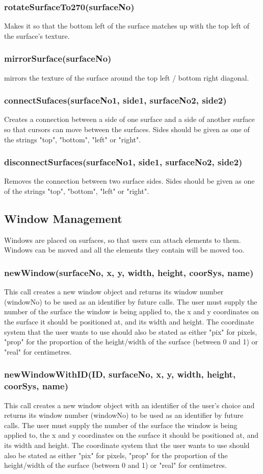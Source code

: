 \documentclass{acm_proc_article-sp}
\begin{document}
\subsubsection{rotateSurfaceTo270(surfaceNo)}
Makes it so that the bottom left of the surface matches up with the top left of the surface's texture.
\subsubsection{mirrorSurface(surfaceNo)}
mirrors the texture of the surface around the top left / bottom right diagonal.
\subsubsection{connectSufaces(surfaceNo1, side1, surfaceNo2, side2)}
Creates a connection between a side of one surface and a side of another surface so that cursors can move between the surfaces. Sides should be given as one of the strings "top", "bottom", "left" or "right".
\subsubsection{disconnectSurfaces(surfaceNo1, side1, surfaceNo2, side2)}
Removes the connection between two surface sides. Sides should be given as one of the strings "top", "bottom", "left" or "right".

\subsection{Window Management}
Windows are placed on surfaces, so that users can attach elements to them. Windows can be moved and all the elements they contain will be moved too.
\subsubsection{newWindow(surfaceNo, x, y, width, height, coorSys, name)}
This call creates a new window object and returns its window number (windowNo) to be used as an identifier by future calls. The user must supply the number of the surface the window is being applied to, the x and y coordinates on the surface it should be positioned at, and its width and height. The coordinate system that the user wants to use should also be stated as either "pix" for pixels, "prop" for the proportion of the height/width of the surface (between 0 and 1) or "real" for centimetres.
\subsubsection{newWindowWithID(ID, surfaceNo, x, y, width, height, coorSys, name)}
This call creates a new window object with an identifier of the user's choice and returns its window number (windowNo) to be used as an identifier by future calls. The user must supply the number of the surface the window is being applied to, the x and y coordinates on the surface it should be positioned at, and its width and height. The coordinate system that the user wants to use should also be stated as either "pix" for pixels, "prop" for the proportion of the height/width of the surface (between 0 and 1) or "real" for centimetres.
\end{document}
